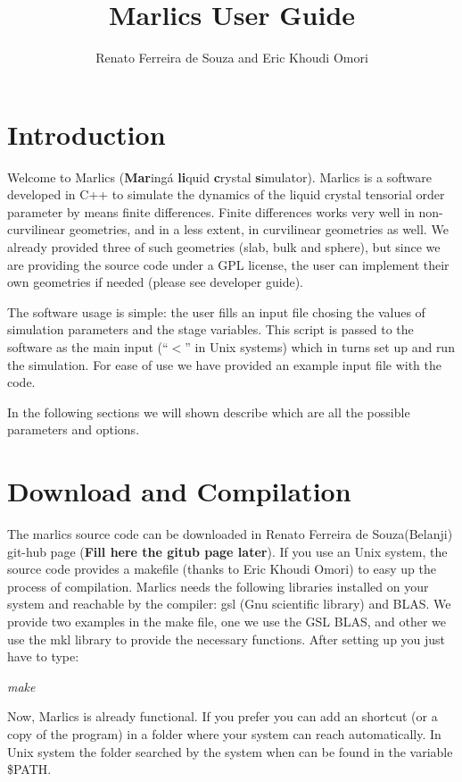 \documentclass{article}
\title{Marlics User Guide}
\author{Renato Ferreira de Souza and
Eric Khoudi Omori}
\newcommand{\consoleline}[2][0.5cm]
{\vspace{#1}
\textit{{#2}}
\vspace{#1}
}
\begin{document}
\maketitle

\section{Introduction}
  
Welcome to Marlics (\textbf{Mar}ingá \textbf{li}quid \textbf{c}rystal
\textbf{s}imulator). Marlics is a software developed in C++ to
simulate the dynamics of the liquid crystal tensorial order parameter
by means finite differences. Finite differences works very well in
non-curvilinear geometries, and in a less extent, in curvilinear
geometries as well. We already provided three of such geometries
(slab, bulk and sphere), but since we are providing the source code
under a GPL license, the user can implement their own geometries if
needed (please see developer guide). 

The software usage is simple: the user fills an input file chosing the
values of simulation parameters and the stage variables. This script
is passed to the software as the main input (``$<$'' in Unix systems)
which in turns set up and run the simulation. For ease of use we have
provided an example input file with the code.

In the following sections we will shown describe which are all the possible 
parameters and options.


\section{Download and Compilation}

The marlics source code can be downloaded in Renato Ferreira de Souza(Belanji) git-hub page (\textbf{Fill here the gitub page later}). If you use an Unix system, the source code provides a makefile (thanks to Eric Khoudi Omori) to easy up the process of compilation. Marlics needs the following libraries installed on your system and reachable by the compiler: gsl (Gnu scientific library) and BLAS. We provide two examples in the make file, one we use the GSL BLAS, and other we use the mkl library to provide the necessary functions.
After setting up you just have to type:

\consoleline{make}

Now, Marlics is already functional. If you prefer you can add an shortcut (or a copy of the program) in a folder where your system can reach automatically. In Unix system the folder searched by the system when can be found in the variable \$PATH.
\end{document}
